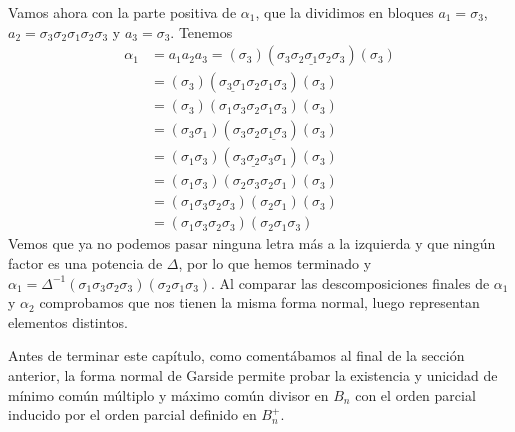 \documentclass[TFG.tex]{subfiles}
\begin{document}
\begin{ej}
Vamos ahora con la parte positiva de $\alpha_1$, que la dividimos en bloques $a_1=\sigma_3$, $a_2=\sigma_3\sigma_2\sigma_1\sigma_2\sigma_3$ y $a_3=\sigma_3$. Tenemos
\begin{align*}
\alpha_1&=a_1a_2a_3=(\sigma_3)(\sigma_3\underline{\sigma_2\sigma_1\sigma_2}\sigma_3)(\sigma_3)\\
&=(\sigma_3)(\underline{\sigma_3\sigma_1}\sigma_2\sigma_1\sigma_3)(\sigma_3)\\
&=(\sigma_3)(\sigma_1\sigma_3\sigma_2\sigma_1\sigma_3)(\sigma_3)\\
&=(\sigma_3\sigma_1)(\sigma_3\sigma_2\underline{\sigma_1\sigma_3})(\sigma_3)\\
&=(\sigma_1\sigma_3)(\underline{\sigma_3\sigma_2\sigma_3}\sigma_1)(\sigma_3)\\
&=(\sigma_1\sigma_3)(\sigma_2\sigma_3\sigma_2\sigma_1)(\sigma_3)\\
&=(\sigma_1\sigma_3\sigma_2\sigma_3)(\sigma_2\sigma_1)(\sigma_3)\\
&=(\sigma_1\sigma_3\sigma_2\sigma_3)(\sigma_2\sigma_1\sigma_3)
\end{align*}
Vemos que ya no podemos pasar ninguna letra más a la izquierda y que ningún factor es una potencia de $\Delta$, por lo que hemos terminado y $\alpha_1=\Delta^{-1}(\sigma_1\sigma_3\sigma_2\sigma_3)(\sigma_2\sigma_1\sigma_3)$. Al comparar las descomposiciones finales de $\alpha_1$ y $\alpha_2$ comprobamos que nos tienen la misma forma normal, luego representan elementos distintos.
\end{ej}

Antes de terminar este capítulo, como comentábamos al final de la sección anterior, la forma normal de Garside permite probar la existencia y unicidad de mínimo común múltiplo y máximo común divisor en $B_n$ con el orden parcial inducido por el orden parcial definido en $B_n^+$.  
\end{document}
